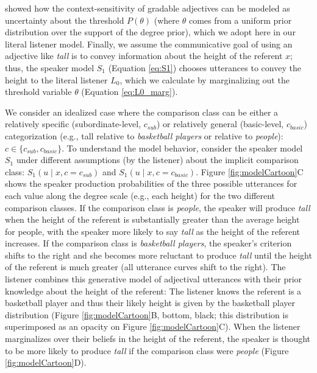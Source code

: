 \documentclass[doc]{apa6}
\begin{document}
 showed how the context-sensitivity of gradable adjectives can be modeled as uncertainty about the threshold $P(\theta)$ (where $\theta$ comes from a uniform prior distribution over the support of the degree prior), which we adopt here in our literal listener model. 
Finally, we assume the communicative goal of using an adjective like \emph{tall} is to convey information about the height of the referent $x$; thus, the speaker model $S_1$ (Equation \ref{eq:S1}) chooses utterances to convey the height to the literal listener $L_0$, which we calculate by marginalizing out the threshold variable $\theta$ (Equation \ref{eq:L0_marg}).
  
We consider an idealized case where the comparison class can be either a relatively specific (subordinate-level, \(c_{sub}\)) or relatively general (basic-level, \(c_{basic}\)) categorization (e.g., tall relative to \emph{basketball players} or relative to \emph{people}): \(c \in \{c_{sub}, c_{basic}\}\).
To understand the model behavior, consider the speaker model \(S_1\) under different assumptions (by the listener) about the implicit comparison class: \(S_{1}(u \mid x, c = c_{sub})\) and \(S_{1}(u \mid x, c = c_{basic})\). 
Figure \ref{fig:modelCartoon}C shows the speaker production probabilities of the three possible utterances for each value along the degree scale (e.g., each height) for the two different comparison classes.  If the comparison class is \emph{people}, the speaker will produce \emph{tall} when the height of the referent is substantially greater than the average height for people, with the speaker more likely to say \emph{tall} as the height of the referent increases.
  If the comparison class is \emph{basketball players}, the speaker's criterion shifts to the right and she becomes more reluctant to produce \emph{tall} until the height of the referent is much greater (all utterance curves shift to the right). 
  The listener combines this generative model of adjectival utterances with their prior knowledge about the height of the referent: The listener knows the referent is a basketball player and thus their likely height is given by the basketball player distribution (Figure \ref{fig:modelCartoon}B, bottom, black; this distribution is superimposed as an opacity on Figure \ref{fig:modelCartoon}C).
  When the listener marginalizes over their beliefs in the height of the referent, the speaker is thought to be more likely to produce \emph{tall} if the comparison class were \emph{people} (Figure \ref{fig:modelCartoon}D).  
\end{document}
